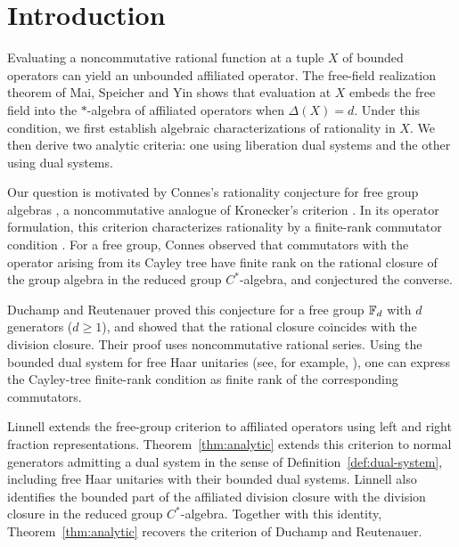 \section{Introduction}\label{sec:introduction}

Evaluating a noncommutative rational function at a tuple $X$ of bounded operators can yield an unbounded affiliated operator.
The free-field realization theorem of Mai, Speicher and Yin \cite[Theorem 1.1]{MSY23} shows that evaluation at $X$ embeds the free field into the $*$-algebra of affiliated operators when $\Delta(X)=d$.
Under this condition, we first establish algebraic characterizations of rationality in $X$.
We then derive two analytic criteria: one using liberation dual systems and the other using dual systems.

Our question is motivated by Connes's rationality conjecture for free group algebras \cite[Section IV.5, Remark 3]{Con94}, a noncommutative analogue of Kronecker's criterion \cite{Kro81}.
In its operator formulation, this criterion characterizes rationality by a finite-rank commutator condition \cite[Section IV.3, Proposition 1]{Con94}.
For a free group, Connes observed that commutators with the operator arising from its Cayley tree have finite rank on the rational closure of the group algebra in the reduced group $C^*$-algebra,
and conjectured the converse.

Duchamp and Reutenauer \cite[Theorem 7]{DR97} proved this conjecture for a free group $\mathbb F_d$ with $d$ generators ($d\geq1$),
and showed that the rational closure coincides with the division closure.
Their proof uses noncommutative rational series.
Using the bounded dual system for free Haar unitaries (see, for example, \cite[Proposition 6.3]{MSY23}),
one can express the Cayley-tree finite-rank condition as finite rank of the corresponding commutators.

Linnell \cite[Theorem 1.1]{Lin00} extends the free-group criterion to affiliated operators using left and right fraction representations.
Theorem~\ref{thm:analytic} extends this criterion to normal generators admitting a dual system in the sense of Definition~\ref{def:dual-system}, including free Haar unitaries with their bounded dual systems.
Linnell also identifies the bounded part of the affiliated division closure with the division closure in the reduced group $C^*$-algebra.
Together with this identity, Theorem~\ref{thm:analytic} recovers the criterion of Duchamp and Reutenauer.

